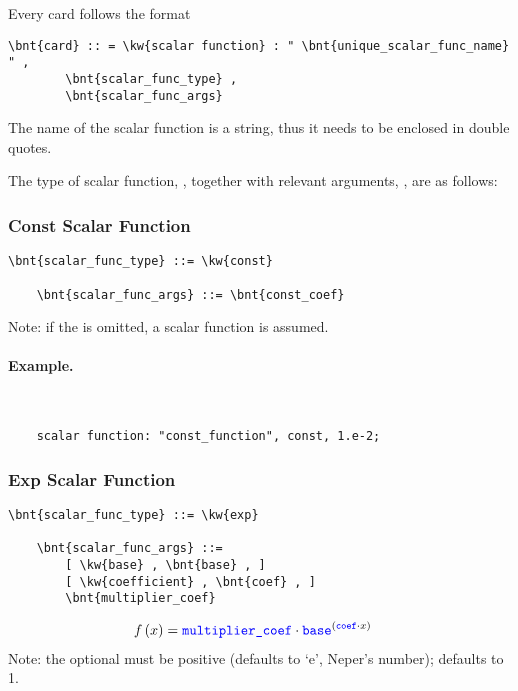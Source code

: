 \noindent
Every  card follows the format
\begin{Verbatim}[commandchars=\\\{\}]
    \bnt{card} :: = \kw{scalar function} : " \bnt{unique_scalar_func_name} " ,
        \bnt{scalar_func_type} ,
        \bnt{scalar_func_args}
\end{Verbatim}
The name of the scalar function is a string, thus it needs to be enclosed
in double quotes.

The type of scalar function,
, together
with relevant arguments, ,
are as follows:
\subsubsection{Const Scalar Function}
\begin{Verbatim}[commandchars=\\\{\}]
    \bnt{scalar_func_type} ::= \kw{const}

    \bnt{scalar_func_args} ::= \bnt{const_coef}
\end{Verbatim}
Note: if the  is omitted,
a  scalar function is assumed.

\paragraph{Example.} \
\begin{verbatim}
    scalar function: "const_function", const, 1.e-2;
\end{verbatim}

\subsubsection{Exp Scalar Function}
\begin{Verbatim}[commandchars=\\\{\}]
    \bnt{scalar_func_type} ::= \kw{exp}

    \bnt{scalar_func_args} ::=
        [ \kw{base} , \bnt{base} , ]
        [ \kw{coefficient} , \bnt{coef} , ]
        \bnt{multiplier_coef}
\end{Verbatim}
\begin{align}
	f\left( x \right)
	&=
	\textcolor{blue}{\texttt{multiplier\_coef}} \cdot \textcolor{blue}{\texttt{base}}^{\left( \textcolor{blue}{\texttt{coef}} \cdot x \right)}
\end{align}
Note: the optional  must be positive
(defaults to `$\textrm{e}$', Neper's number);
 defaults to 1.

